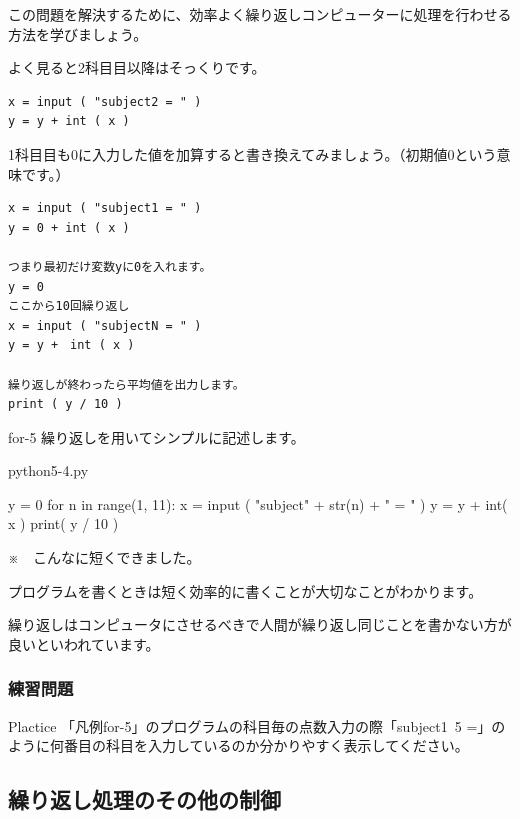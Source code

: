 \documentclass[11pt,a4paper,dvipdfmx,titlepage]{jsreport}
\begin{document}
この問題を解決するために、効率よく繰り返しコンピューターに処理を行わせる方法を学びましょう。

よく見ると2科目目以降はそっくりです。

\begin{verbatim}
x = input ( "subject2 = " )
y = y + int ( x ) 
\end{verbatim}

1科目目も0に入力した値を加算すると書き換えてみましょう。（初期値0という意味です。）
\begin{verbatim}
x = input ( "subject1 = " )
y = 0 + int ( x ) 

つまり最初だけ変数yに0を入れます。
y = 0
ここから10回繰り返し
x = input ( "subjectN = " )
y = y +　int ( x )

繰り返しが終わったら平均値を出力します。
print ( y / 10 )
\end{verbatim}

\begin{pabox}{for-5}
繰り返しを用いてシンプルに記述します。


\begin{codebox}{python5-4.py}
\begin{listing}{1}
y = 0
for n in range(1, 11):
    x = input ( "subject" + str(n) + " = " )
    y = y + int( x )
print( y / 10 )
\end{listing}
\end{codebox}
※　こんなに短くできました。

\end{pabox}

プログラムを書くときは短く効率的に書くことが大切なことがわかります。

繰り返しはコンピュータにさせるべきで人間が繰り返し同じことを書かない方が良いといわれています。

\subsubsection{練習問題}
\begin{plabox}{Plactice}
「凡例for-5」のプログラムの科目毎の点数入力の際「subject1~5 =」のように何番目の科目を入力しているのか分かりやすく表示してください。



\end{plabox}
\subsection{繰り返し処理のその他の制御}
\end{document}
